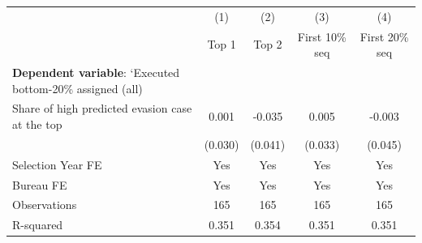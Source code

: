 {
\def\sym#1{\ifmmode^{#1}\else\(^{#1}\)\fi}
\begin{tabular}{l*{4}{c}}
\toprule
            &\multicolumn{1}{c}{(1)}&\multicolumn{1}{c}{(2)}&\multicolumn{1}{c}{(3)}&\multicolumn{1}{c}{(4)}\\
            &\multicolumn{1}{c}{Top 1}&\multicolumn{1}{c}{Top 2}&\multicolumn{1}{c}{First 10\% seq}&\multicolumn{1}{c}{First 20\% seq}\\
\midrule
\textbf{Dependent variable}: `Executed bottom-20\% \/ assigned (all)&                     &                     &                     &                     \\
\addlinespace
Share of high predicted evasion case at the top&       0.001         &      -0.035         &       0.005         &      -0.003         \\
            &     (0.030)         &     (0.041)         &     (0.033)         &     (0.045)         \\
\midrule
Selection Year FE&         Yes         &         Yes         &         Yes         &         Yes         \\
Bureau FE   &         Yes         &         Yes         &         Yes         &         Yes         \\
Observations&         165         &         165         &         165         &         165         \\
R-squared   &       0.351         &       0.354         &       0.351         &       0.351         \\
\bottomrule
\end{tabular}
}
